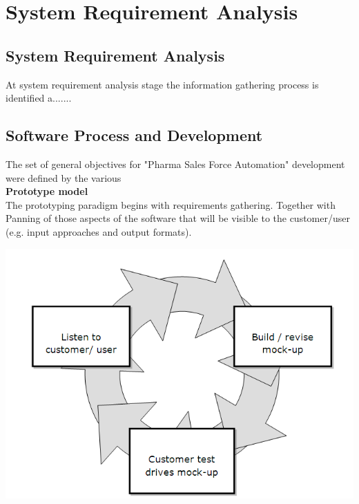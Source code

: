 \chapter{System Requirement Analysis}


\section{System Requirement Analysis}
 At system requirement analysis stage the information gathering process is identified a.......






\section{Software Process and Development}
The set of general objectives for "Pharma Sales Force Automation" development were defined by the various \\
\textbf{Prototype model}\\

The prototyping paradigm begins with requirements gathering. Together with Panning of those aspects of the software that will be visible to the customer/user (e.g. input approaches and output formats).


\includegraphics[scale=0.8]{Ch2/prototype.png}

